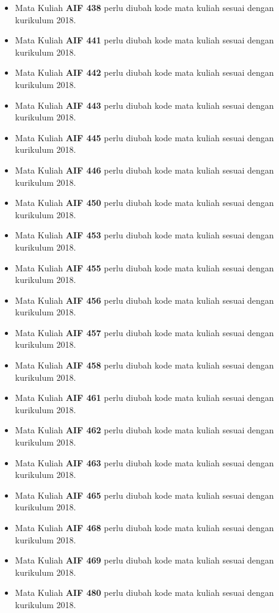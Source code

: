 \begin{enumerate}
\begin{itemize}
		\item Mata Kuliah \textbf{AIF 438} perlu diubah kode mata kuliah sesuai dengan kurikulum 2018.
		\item Mata Kuliah \textbf{AIF 441} perlu diubah kode mata kuliah sesuai dengan kurikulum 2018.
		\item Mata Kuliah \textbf{AIF 442} perlu diubah kode mata kuliah sesuai dengan kurikulum 2018.
		\item Mata Kuliah \textbf{AIF 443} perlu diubah kode mata kuliah sesuai dengan kurikulum 2018.
		\item Mata Kuliah \textbf{AIF 445} perlu diubah kode mata kuliah sesuai dengan kurikulum 2018.
		\item Mata Kuliah \textbf{AIF 446} perlu diubah kode mata kuliah sesuai dengan kurikulum 2018.
		\item Mata Kuliah \textbf{AIF 450} perlu diubah kode mata kuliah sesuai dengan kurikulum 2018.
		\item Mata Kuliah \textbf{AIF 453} perlu diubah kode mata kuliah sesuai dengan kurikulum 2018.
		\item Mata Kuliah \textbf{AIF 455} perlu diubah kode mata kuliah sesuai dengan kurikulum 2018.
		\item Mata Kuliah \textbf{AIF 456} perlu diubah kode mata kuliah sesuai dengan kurikulum 2018.
		\item Mata Kuliah \textbf{AIF 457} perlu diubah kode mata kuliah sesuai dengan kurikulum 2018.
		\item Mata Kuliah \textbf{AIF 458} perlu diubah kode mata kuliah sesuai dengan kurikulum 2018.
		\item Mata Kuliah \textbf{AIF 461} perlu diubah kode mata kuliah sesuai dengan kurikulum 2018.
		\item Mata Kuliah \textbf{AIF 462} perlu diubah kode mata kuliah sesuai dengan kurikulum 2018.
		\item Mata Kuliah \textbf{AIF 463} perlu diubah kode mata kuliah sesuai dengan kurikulum 2018.
		\item Mata Kuliah \textbf{AIF 465} perlu diubah kode mata kuliah sesuai dengan kurikulum 2018.
		\item Mata Kuliah \textbf{AIF 468} perlu diubah kode mata kuliah sesuai dengan kurikulum 2018.
		\item Mata Kuliah \textbf{AIF 469} perlu diubah kode mata kuliah sesuai dengan kurikulum 2018.
		\item Mata Kuliah \textbf{AIF 480} perlu diubah kode mata kuliah sesuai dengan kurikulum 2018.

\end{itemize}
\end{enumerate}
